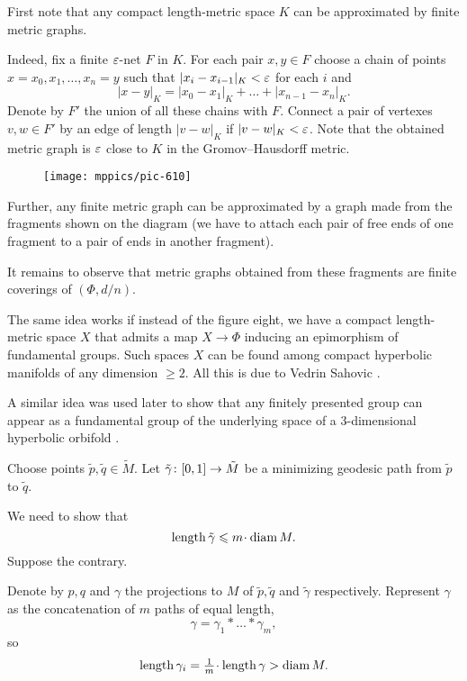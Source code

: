 First note that any compact length-metric space $K$ can be approximated by finite metric graphs.

Indeed, fix a finite $\varepsilon$-net $F$ in $K$.
For each pair $x,y\in F$ choose a chain of points $x=x_0,x_1,\dots, x_n=y$ such that
$|x_i-x_{i-1}|_K<\varepsilon$ for each $i$ and 
\[|x-y|_K=|x_0-x_1|_K+\dots+|x_{n-1}-x_n|_K.\]
Denote by $F'$ the union of all these chains with $F$.
Connect a pair of vertexes $v,w\in F'$ by an edge of length $|v-w|_K$ if $|v-w|_K<\varepsilon$.
Note that the obtained metric graph is $\varepsilon$ close to $K$ in the Gromov--Hausdorff metric.

\begin{wrapfigure}{o}{25 mm}
\vskip-3mm
\centering
\texttt{[image: mppics/pic-610]}
\vskip-3mm
\end{wrapfigure}

Further, any finite metric graph can be approximated by a graph made from the fragments shown on the diagram
(we have to attach each pair of free ends of one fragment to a pair of ends in another fragment).

It remains to observe that metric graphs obtained from these fragments are finite coverings of $(\Phi,d/n)$.
\qeds


The same idea works if instead of the figure eight, we have a compact length-metric space $X$ that admits a map $X\to\Phi$ inducing an epimorphism of fundamental groups.
Such spaces $X$ can be found among compact hyperbolic manifolds of any dimension $\ge 2$.
All this is due to Vedrin Sahovic \cite{sahovic}.

A similar idea was used later to show that any finitely presented group can appear as a fundamental group of the underlying space of a 3-dimensional hyperbolic orbifold \cite{panov-petrunin-telescopic}.





Choose points $\tilde p,\tilde q\in\tilde M$.
Let  
$\tilde\gamma\:[0,1]\z\to \tilde M$ be a minimizing geodesic path from $\tilde p$ to $\tilde q$. 

We need to show that 
\[\length \tilde\gamma\le m\cdot \diam M.\]
Suppose the contrary.

Denote by $p,q$ and $\gamma$ the projections to $M$ of $\tilde p,\tilde q$ and $\tilde \gamma$ respectively. 
Represent $\gamma$
as the concatenation of $m$ paths of equal length,
\[\gamma=\gamma_1{*}\dots{*}\gamma_m,\] 
so
\[\length\gamma_i=\tfrac{1}m\cdot\length\gamma>\diam M.\] 

